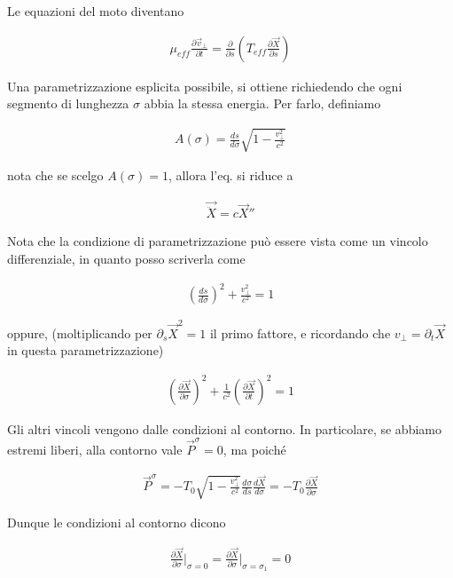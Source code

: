 \documentclass{report}
\begin{document}
Le equazioni del moto diventano 

\begin{align}
    \mu_{eff}\frac{\partial \vec{v}_\perp}{\partial t} = \frac{\partial}{\partial s}\left(T_{eff}\frac{\partial \vec{X}}{\partial s} \right)
\end{align}

Una parametrizzazione esplicita possibile, si ottiene richiedendo che ogni segmento di lunghezza \(\sigma\) abbia la stessa energia. Per farlo, definiamo 

\begin{align}
    A(\sigma ) = \frac{ds}{d\sigma}\sqrt{1 - \frac{v_\perp^2}{c^2}}
\end{align}

nota che se scelgo \(A(\sigma) = 1\), allora l'eq. si riduce a 

\begin{align}
    \vec{\ddot{X}} = c \vec{X}''
\end{align}

Nota che la condizione di parametrizzazione può essere vista come un vincolo differenziale, in quanto posso scriverla come 

\begin{align}
    \left(\frac{ds}{d\sigma} \right)^2 + \frac{v_\perp^2}{c^2} = 1
\end{align}

oppure, (moltiplicando per \(\partial_s\vec{X}^2 =1\) il primo fattore, e ricordando che \(v_\perp = \partial_t \vec{X}\) in questa parametrizzazione) 

\begin{align}
    \left(\frac{\partial \vec{X}}{\partial \sigma} \right)^2 + \frac{1}{c^2}\left(\frac{\partial \vec{X}}{\partial t} \right)^2 = 1
\end{align}

Gli altri vincoli vengono dalle condizioni al contorno. In particolare, se abbiamo estremi liberi, alla contorno vale \(\vec{P}^\sigma = 0\), ma poiché 

\begin{align}
    \vec{P}^\sigma = -T_0 \sqrt{1-\frac{v_\perp^2}{c^2}}\frac{d\sigma}{ds}\frac{d\vec{X}}{d\sigma} = -T_0 \frac{\partial \vec{X}}{\partial \sigma}
\end{align}

Dunque le condizioni al contorno dicono 

\begin{align}
    \frac{\partial \vec{X}}{\partial \sigma}\biggr|_{\sigma = 0} = \frac{\partial \vec{X}}{\partial \sigma}\biggr|_{\sigma = \sigma_1} = 0 
\end{align}
\end{document}
